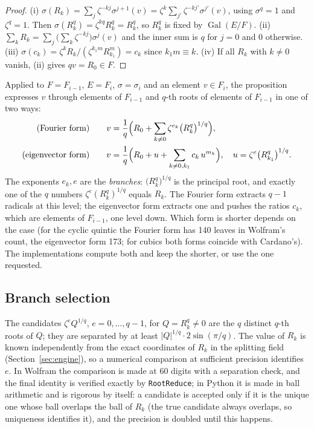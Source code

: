 \documentclass[11pt,a4paper]{article}
\theoremstyle{definition}
\theoremstyle{remark}
\newcommand{\Gal}{\operatorname{Gal}}
\newcommand{\code}[1]{\texttt{#1}}
\begin{document}
\begin{proof}
(i) $\sigma(R_k)=\sum_j\zeta^{-kj}\sigma^{j+1}(v)=\zeta^{k}\sum_{j'}\zeta^{-kj'}\sigma^{j'}(v)$,
using $\sigma^q=1$ and $\zeta^{q}=1$.  Then $\sigma(R_k^q)=\zeta^{kq}R_k^q=R_k^q$, so
$R_k^q$ is fixed by $\Gal(E/F)$.  (ii) $\sum_kR_k=\sum_j\bigl(\sum_k\zeta^{-kj}\bigr)\sigma^j(v)$
and the inner sum is $q$ for $j=0$ and $0$ otherwise.  (iii) $\sigma(c_k)=\zeta^kR_k/(\zeta^{k_1m}R_{k_1}^m)=c_k$
since $k_1m\equiv k$.  (iv) If all $R_k$ with $k\ne0$ vanish, (ii) gives $qv=R_0\in F$.
\end{proof}

Applied to $F=F_{i-1}$, $E=F_i$, $\sigma=\sigma_i$ and an element $v\in F_i$, the
proposition expresses $v$ through elements of $F_{i-1}$ and $q$-th roots of elements of
$F_{i-1}$ in one of two ways:
\begin{align}
\text{(Fourier form)}\qquad v&=\frac1q\Bigl(R_0+\sum_{k\ne0}\zeta^{e_k}\bigl(R_k^q\bigr)^{1/q}\Bigr),\label{eq:fourier}\\
\text{(eigenvector form)}\qquad v&=\frac1q\Bigl(R_0+u+\sum_{k\ne0,k_1}c_k\,u^{m_k}\Bigr),
\quad u=\zeta^{e}\bigl(R_{k_1}^q\bigr)^{1/q}.\label{eq:eigen}
\end{align}
The exponents $e_k,e$ are the \emph{branches}: $\bigl(R_k^q\bigr)^{1/q}$ is the principal
root, and exactly one of the $q$ numbers $\zeta^e(R_k^q)^{1/q}$ equals $R_k$.  The Fourier
form extracts $q-1$ radicals at this level; the eigenvector form extracts one and pushes
the ratios $c_k$, which are elements of $F_{i-1}$, one level down.  Which form is shorter
depends on the case (for the cyclic quintic the Fourier form has 140 leaves in Wolfram's
count, the eigenvector form 173; for cubics both forms coincide with Cardano's).  The
implementations compute both and keep the shorter, or use the one requested.

\subsection{Branch selection}\label{sec:branch}

The candidates $\zeta^e Q^{1/q}$, $e=0,\dots,q-1$, for $Q=R_k^q\neq0$ are the $q$ distinct
$q$-th roots of $Q$; they are separated by at least
$|Q|^{1/q}\cdot2\sin(\pi/q)$.  The value of $R_k$ is known independently from the exact
coordinates of $R_k$ in the splitting field (Section~\ref{sec:engine}), so a numerical
comparison at sufficient precision identifies $e$.  In Wolfram the comparison is made at
60 digits with a separation check, and the final identity is verified exactly by
\code{RootReduce}; in Python it is made in ball arithmetic and is rigorous by itself: a
candidate is accepted only if it is the unique one whose ball overlaps the ball of $R_k$
(the true candidate always overlaps, so uniqueness identifies it), and the precision is
doubled until this happens.
\end{document}
